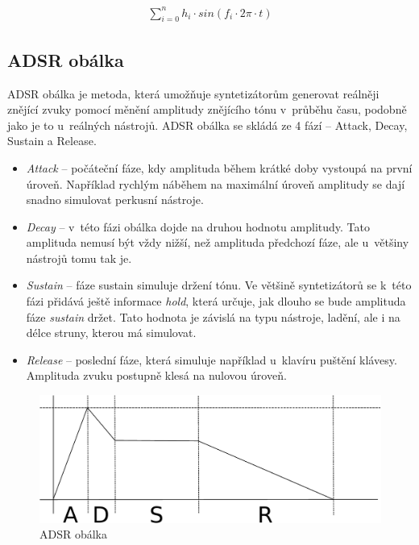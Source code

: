 \begin{eqnarray}
   \sum_{i = 0}^{n} h_{i} \cdot sin(f_i \cdot 2\pi \cdot t)\label{eq2}
\end{eqnarray}

\subsection{ADSR obálka} \label{ADSR}
ADSR obálka je metoda, která umožňuje syntetizátorům generovat reálněji znějící zvuky pomocí měnění amplitudy znějícího tónu v~průběhu času, podobně jako je to u~reálných nástrojů.
ADSR obálka se skládá ze 4 fází -- Attack, Decay, Sustain a Release.

\begin{itemize}
 \item \emph{Attack} -- počáteční fáze, kdy amplituda během krátké doby vystoupá na první úroveň. Například rychlým náběhem na maximální úroveň amplitudy se dají snadno simulovat perkusní nástroje.
 \item \emph{Decay} -- v~této fázi obálka dojde na druhou hodnotu amplitudy. Tato amplituda nemusí být vždy nižší, než amplituda předchozí fáze, ale u~většiny nástrojů tomu tak je.
 \item \emph{Sustain} -- fáze sustain simuluje držení tónu. Ve většině syntetizátorů se k~této fázi přidává ještě informace \emph{hold}, která určuje, jak dlouho se bude amplituda fáze \emph{sustain} držet. Tato hodnota je závislá na typu nástroje, ladění, ale i na délce struny, kterou má simulovat.
 \item \emph{Release} -- poslední fáze, která simuluje například u~klavíru puštění klávesy. Amplituda zvuku postupně klesá na nulovou úroveň.
\end{itemize}

\begin{figure}[h]
    \begin{center}
      \includegraphics[scale=0.65]{fig/adsr} 
      \caption{ADSR obálka} 
      \label{adsrFIG}
    \end{center}
\end{figure}


